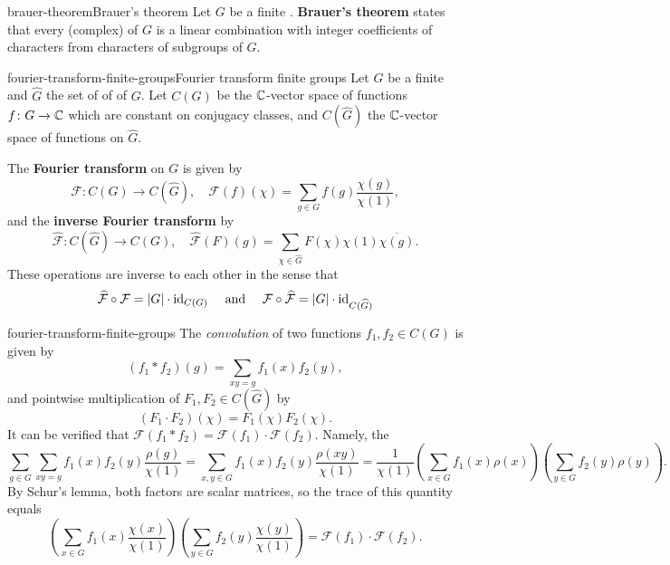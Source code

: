 \begin{topic}{brauer-theorem}{Brauer's theorem}
    Let $G$ be a finite . \textbf{Brauer's theorem} states that every (complex)  of $G$ is a linear combination with integer coefficients of characters  from characters of  subgroups of $G$.
\end{topic}

\begin{topic}{fourier-transform-finite-groups}{Fourier transform finite groups}
    Let $G$ be a finite  and $\widehat{G}$ the set of  of  of $G$. Let $C(G)$ be the $\mathbb{C}$-vector space of functions $f \colon G \to \mathbb{C}$ which are constant on conjugacy classes, and $C(\widehat{G})$ the $\mathbb{C}$-vector space of functions on $\widehat{G}$.
    
    The \textbf{Fourier transform} on $G$ is given by
    \[ \mathcal{F} \colon C(G) \to C(\widehat{G}), \quad \mathcal{F}(f)(\chi) = \sum_{g \in G} f(g) \frac{\chi(g)}{\chi(1)} , \]
    and the \textbf{inverse Fourier transform} by
    \[ \widehat{\mathcal{F}} \colon C(\widehat{G}) \to C(G), \quad \widehat{\mathcal{F}}(F)(g) = \sum_{\chi \in \widehat{G}} F(\chi) \chi(1) \overline{\chi(g)} . \]
    These operations are inverse to each other in the sense that
    \[ \widehat{\mathcal{F}} \circ \mathcal{F} = |G| \cdot \textup{id}_{C(G)} \quad \textup{ and } \quad \mathcal{F} \circ \widehat{\mathcal{F}} = |G| \cdot \textup{id}_{C(\widehat{G})} \]
\end{topic}

\begin{example}{fourier-transform-finite-groups}
    The \textit{convolution} of two functions $f_1, f_2 \in C(G)$ is given by
    \[ (f_1 * f_2)(g) = \sum_{xy = g} f_1(x) f_2(y) , \]
    and pointwise multiplication of $F_1, F_2 \in C(\widehat{G})$ by
    \[ (F_1 \cdot F_2)(\chi) = F_1(\chi) F_2(\chi) . \]
    It can be verified that $\mathcal{F}(f_1 * f_2) = \mathcal{F}(f_1) \cdot \mathcal{F}(f_2)$. Namely, the
    \[ \sum_{g \in G} \sum_{xy = g} f_1(x) f_2(y) \frac{\rho(g)}{\chi(1)} = \sum_{x, y \in G} f_1(x) f_2(y) \frac{\rho(xy)}{\chi(1)} = \frac{1}{\chi(1)} \left( \sum_{x \in G} f_1(x) \rho(x) \right) \left( \sum_{y \in G} f_2(y) \rho(y) \right) . \]
    By Schur's lemma, both factors are scalar matrices, so the trace of this quantity equals
    \[ \left( \sum_{x \in G} f_1(x) \frac{\chi(x)}{\chi(1)} \right) \left( \sum_{y \in G} f_2(y) \frac{\chi(y)}{\chi(1)} \right) = \mathcal{F}(f_1) \cdot \mathcal{F}(f_2) . \]
\end{example}

